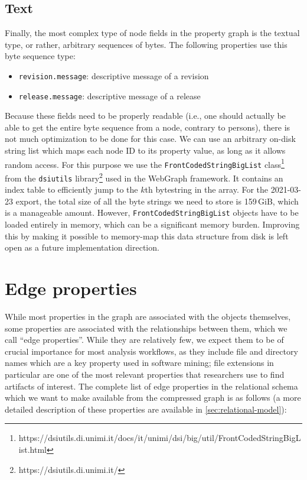 \subsection{Text}%
\label{sec:mapping-text}

Finally, the most complex type of node fields in the property graph is the
textual type, or rather, arbitrary sequences of bytes. The following properties
use this byte sequence type:

\begin{itemize}
    \setlength\itemsep{0em}
    \item \texttt{revision.message}: descriptive message of a revision
    \item \texttt{release.message}: descriptive message of a release
\end{itemize}

Because these fields need to be properly readable (i.e., one should actually be
able to get the entire byte sequence from a node, contrary to persons), there
is not much optimization to be done for this case. We can use an arbitrary
on-disk string list which maps each node ID to its property value, as long as
it allows random access. For this purpose we use the
\texttt{FrontCodedStringBigList}
class\footnote{https://dsiutils.di.unimi.it/docs/it/unimi/dsi/big/util/FrontCodedStringBigList.html}
from the \texttt{dsiutils} library\footnote{https://dsiutils.di.unimi.it/} used
in the WebGraph framework. It contains an index table to efficiently jump to
the $k$th bytestring in the array.
For the 2021-03-23 export, the total size of all the byte strings we need to
store is 159\,GiB, which is a manageable amount.  However,
\texttt{FrontCodedStringBigList} objects have to be loaded entirely in memory,
which can be a significant memory burden. Improving this by making it possible
to memory-map this data structure from disk is left open as a future
implementation direction.

\section{Edge properties}%
\label{sec:mapping-edge-labels}

While most properties in the graph are associated with the objects themselves,
some properties are associated with the relationships between them, which we
call ``edge properties''. While they are relatively few, we expect them to be
of crucial importance for most analysis workflows, as they include file and
directory names which are a key property used in software mining; file
extensions in particular are one of the most relevant properties that
researchers use to find artifacts of interest. The complete list of edge
properties in the relational schema which we want to make available from the
compressed graph is as follows (a more detailed description of these properties
are available in \cref{sec:relational-model}):

